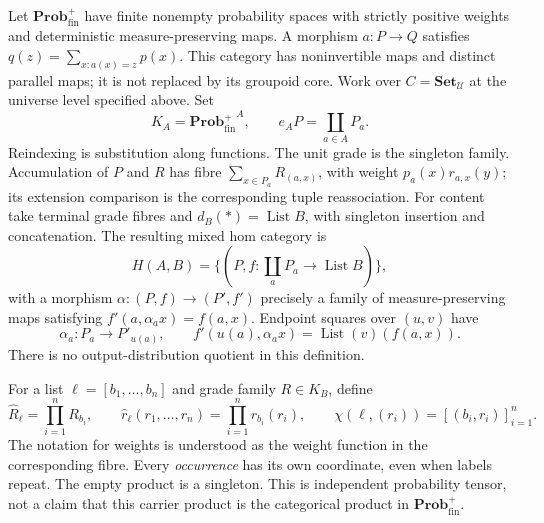 \documentclass[11pt]{article}
\theoremstyle{definition}
\newcommand{\Set}{\mathbf{Set}}
\newcommand{\Prob}{\mathbf{Prob}^{+}_{\mathrm{fin}}}
\newcommand{\List}{\operatorname{List}}
\begin{document}
Let $\Prob$ have finite nonempty probability spaces with strictly positive
weights and deterministic measure-preserving maps. A morphism $a:P\to Q$
satisfies $q(z)=\sum_{x:a(x)=z}p(x)$. This category has noninvertible maps and
distinct parallel maps; it is not replaced by its groupoid core. Work over
$C=\Set_{\mathcal U}$ at the universe level specified above. Set
\[
 K_A={\Prob}^A,\qquad e_AP=\coprod_{a\in A}P_a.
\]
Reindexing is substitution along functions. The unit grade is the singleton
family. Accumulation of $P$ and $R$ has fibre
$\sum_{x\in P_a}R_{(a,x)}$, with weight $p_a(x)r_{a,x}(y)$; its extension
comparison is the corresponding tuple reassociation. For content take
terminal grade fibres and $d_B(*)=\List B$, with singleton insertion and
concatenation. The resulting mixed hom category is
\[
 H(A,B)=\{(P,f:\textstyle\coprod_aP_a\to\List B)\},
\]
with a morphism $\alpha:(P,f)\to(P',f')$ precisely a family of
measure-preserving maps satisfying $f'(a,\alpha_a x)=f(a,x)$.
Endpoint squares over $(u,v)$ have
\begin{equation}\label{eq:probsquare}
 \alpha_a:P_a\to P'_{u(a)},\qquad
 f'(u(a),\alpha_ax)=\List(v)(f(a,x)).
\end{equation}
There is no output-distribution quotient in this definition.

For a list $\ell=[b_1,\ldots,b_n]$ and grade family $R\in K_B$, define
\begin{equation}\label{eq:probchi}
 \widehat R_\ell=\prod_{i=1}^nR_{b_i},\qquad
 \widehat r_\ell(r_1,\ldots,r_n)=\prod_{i=1}^nr_{b_i}(r_i),\qquad
 \chi(\ell,(r_i))=[(b_i,r_i)]_{i=1}^n.
\end{equation}
The notation for weights is understood as the weight function in the
corresponding fibre. Every \emph{occurrence} has its own coordinate, even
when labels repeat. The empty product is a singleton. This is independent
probability tensor, not a claim that this carrier product is the categorical
product in $\Prob$.
\end{document}
